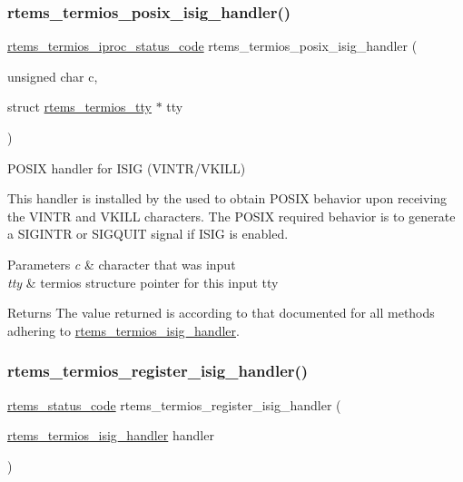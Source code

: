 \subsubsection{\texorpdfstring{rtems\_termios\_posix\_isig\_handler()}{rtems\_termios\_posix\_isig\_handler()}}
{\footnotesize\ttfamily \mbox{\hyperlink{group__Termios_ga8d00143bb99772a960e237f16437fc1b}{rtems\+\_\+termios\+\_\+iproc\+\_\+status\+\_\+code}} rtems\+\_\+termios\+\_\+posix\+\_\+isig\+\_\+handler (\begin{DoxyParamCaption}\item[{unsigned char}]{c,  }\item[{struct \mbox{\hyperlink{structrtems__termios__tty}{rtems\+\_\+termios\+\_\+tty}} $\ast$}]{tty }\end{DoxyParamCaption})}



P\+O\+S\+IX handler for I\+S\+IG (V\+I\+N\+T\+R/\+V\+K\+I\+LL) 

This handler is installed by the used to obtain P\+O\+S\+IX behavior upon receiving the V\+I\+N\+TR and V\+K\+I\+LL characters. The P\+O\+S\+IX required behavior is to generate a S\+I\+G\+I\+N\+TR or S\+I\+G\+Q\+U\+IT signal if I\+S\+IG is enabled.


\begin{DoxyParams}{Parameters}
{\em c} & character that was input \\
\hline
{\em tty} & termios structure pointer for this input tty\\
\hline
\end{DoxyParams}
\begin{DoxyReturn}{Returns}
The value returned is according to that documented for all methods adhering to \mbox{\hyperlink{group__Termios_ga8a2610b7c8bcc2c80bbd040f0e773faf}{rtems\+\_\+termios\+\_\+isig\+\_\+handler}}. 
\end{DoxyReturn}
\mbox{\label{group__Termios_gac24c80209e7bfdf9a74119103c30e221}} 
\subsubsection{\texorpdfstring{rtems\_termios\_register\_isig\_handler()}{rtems\_termios\_register\_isig\_handler()}}
{\footnotesize\ttfamily \mbox{\hyperlink{group__ClassicStatus_ga545d41846817eaba6143d52ee4d9e9fe}{rtems\+\_\+status\+\_\+code}} rtems\+\_\+termios\+\_\+register\+\_\+isig\+\_\+handler (\begin{DoxyParamCaption}\item[{\mbox{\hyperlink{group__Termios_ga8a2610b7c8bcc2c80bbd040f0e773faf}{rtems\+\_\+termios\+\_\+isig\+\_\+handler}}}]{handler }\end{DoxyParamCaption})}



